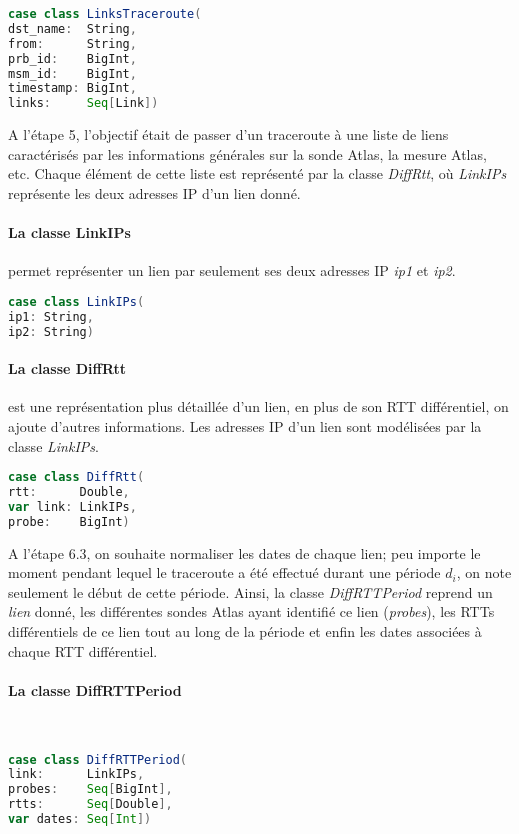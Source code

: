 \begin{lstlisting}[language=scala]
case class LinksTraceroute(
dst_name:  String,
from:      String,
prb_id:    BigInt,
msm_id:    BigInt,
timestamp: BigInt,
links:     Seq[Link])
\end{lstlisting}


A l'étape 5, l'objectif était de passer d'un traceroute à une liste de liens caractérisés par les informations générales sur la sonde Atlas, la mesure Atlas, etc. Chaque élément de cette liste est représenté par la classe \textit{DiffRtt}, où \textit{LinkIPs} représente les deux adresses IP d'un lien donné.
\paragraph{La classe LinkIPs} permet représenter un lien par seulement ses deux adresses IP \textit{ip1} et \textit{ip2}.
\begin{lstlisting}[language=scala]
case class LinkIPs(
ip1: String,
ip2: String)
\end{lstlisting}

\paragraph{La classe DiffRtt} est une représentation plus détaillée d'un lien, en plus de son RTT différentiel, on ajoute d'autres informations.  Les adresses IP d'un lien sont modélisées par la classe \textit{LinkIPs}.

\begin{lstlisting}[language=scala]
case class DiffRtt(
rtt:      Double,
var link: LinkIPs,
probe:    BigInt)
\end{lstlisting}

A l'étape 6.3, on souhaite normaliser les dates de chaque lien; peu importe le moment pendant lequel le traceroute a été effectué durant une période $d_i$, on note seulement le début de cette période. Ainsi,  la classe  \textit{DiffRTTPeriod}  reprend un \textit{lien} donné, les différentes sondes Atlas ayant identifié ce lien (\textit{probes}), les RTTs différentiels de ce lien tout au long de la période et enfin les dates associées à chaque RTT différentiel.
\paragraph{La classe DiffRTTPeriod } ~
\begin{lstlisting}[language=scala]
case class DiffRTTPeriod(
link:      LinkIPs,
probes:    Seq[BigInt],
rtts:      Seq[Double],
var dates: Seq[Int])
\end{lstlisting}

